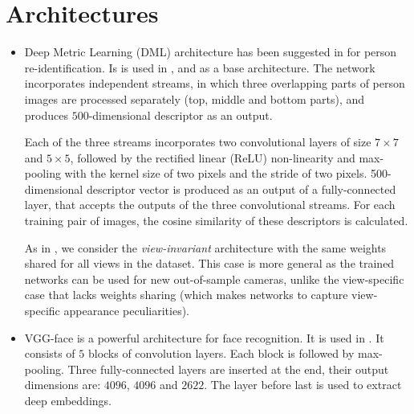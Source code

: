 \section{Architectures}
\label{sect:intro_architectures}
\begin{itemize}

    \item Deep Metric Learning (DML) architecture has been suggested in \citep{Yi14} for person re-identification.
    Is is used in ,  and  as a base architecture.
    The network incorporates independent streams, in which three overlapping parts of person images are processed separately (top, middle and bottom parts), and produces  $500$-dimensional descriptor as an output.

 Each of the three streams incorporates two convolutional layers of size $7\times7$ and $5\times5$, followed by the rectified linear (ReLU) non-linearity and max-pooling with the kernel size of two pixels and the stride of two pixels.  500-dimensional descriptor vector is produced as an output of a fully-connected layer, that accepts the outputs of the three convolutional streams. For each training pair of images, the cosine similarity of these descriptors is calculated. %

 As in \citep{yi2014deep}, we consider the \textit{view-invariant} architecture with the same weights shared for all views in the dataset. This case is more general as the trained networks can be used for new out-of-sample cameras, unlike the view-specific case that lacks weights sharing (which makes networks to capture view-specific appearance peculiarities).
    
    \item VGG-face \citep{parkhi2015deep} is a powerful architecture for face recognition. It is used in . It consists of $5$ blocks of convolution layers. Each block is followed by max-pooling. Three fully-connected layers are inserted at the end, their output dimensions are: $4096$, $4096$ and $2622$. The layer before last is used to extract deep embeddings. 
    
\end{itemize}
